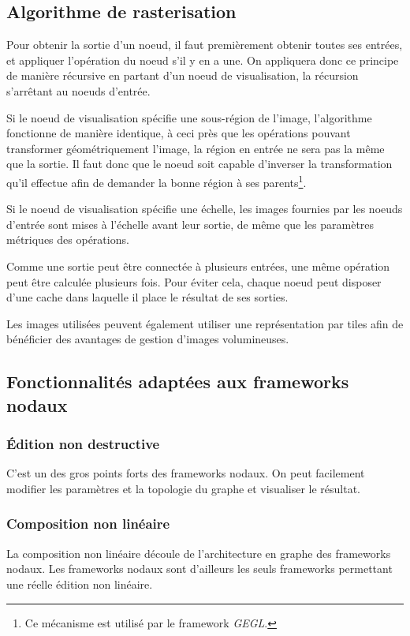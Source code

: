 		\subsection{Algorithme de rasterisation}
			Pour obtenir la sortie d'un noeud, il faut premièrement obtenir toutes ses entrées, et appliquer l'opération du
			noeud s'il y en a une. On appliquera donc ce principe de manière récursive en partant d'un noeud de visualisation,
			la récursion s'arrêtant au noeuds d'entrée.

			Si le noeud de visualisation spécifie une sous-région de l'image, l'algorithme fonctionne de manière identique, à
			ceci près que les opérations pouvant transformer géométriquement l'image, la région en entrée ne sera pas la même que
			la sortie. Il faut donc que le noeud soit capable d'inverser la transformation qu'il effectue afin de demander la bonne
			région à ses parents\footnote{Ce mécanisme est utilisé par le framework \emph{GEGL}.}. 

			Si le noeud de visualisation spécifie une échelle, les images fournies par les noeuds d'entrée sont mises à l'échelle avant
			leur sortie, de même que les paramètres métriques des opérations. 

			Comme une sortie peut être connectée à plusieurs entrées, une même opération peut être calculée plusieurs fois. Pour éviter
			cela, chaque noeud peut disposer d'une cache dans laquelle il place le résultat de ses sorties. 

			Les images utilisées peuvent également utiliser une représentation par tiles afin de bénéficier des avantages de gestion d'images
			volumineuses.

		\subsection{Fonctionnalités adaptées aux frameworks nodaux}
			\subsubsection{Édition non destructive}
				C'est un des gros points forts des frameworks nodaux. On peut facilement modifier les paramètres et la topologie du graphe
				et visualiser le résultat.
			\subsubsection{Composition non linéaire}
				La composition non linéaire découle de l'architecture en graphe des frameworks nodaux. Les frameworks nodaux sont d'ailleurs
				les seuls frameworks permettant une réelle édition non linéaire. 
